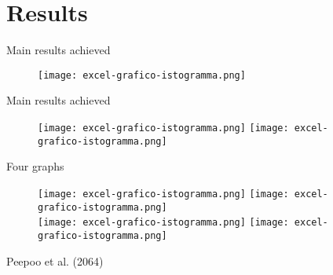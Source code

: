 \documentclass{beamer} %
\begin{document}
\section{Results}

\begin{frame}{Main results achieved}
    \begin{figure}
        \centering
        \texttt{[image: excel-grafico-istogramma.png]}
        \label{fig:enter-label}
    \end{figure}
\end{frame}

\begin{frame}{Main results achieved}
    \begin{figure}
        \centering
        \texttt{[image: excel-grafico-istogramma.png]}
        \texttt{[image: excel-grafico-istogramma.png]}
    \end{figure}
\end{frame}

\begin{frame}{Four graphs}
    \begin{figure}
        \centering
        \texttt{[image: excel-grafico-istogramma.png]}
        \texttt{[image: excel-grafico-istogramma.png]}\\
        \texttt{[image: excel-grafico-istogramma.png]}
        \texttt{[image: excel-grafico-istogramma.png]}\\
    \end{figure}
\bigskip
\centering
\scriptsize{Peepoo et al. (2064)}
\end{frame}
\end{document}
